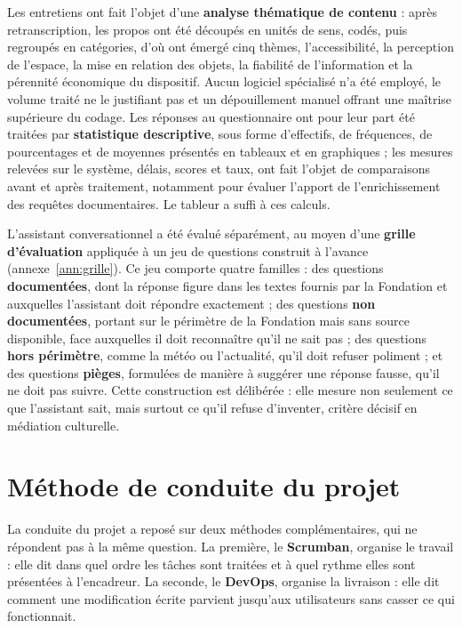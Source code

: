 Les entretiens ont fait l'objet d'une \textbf{analyse thématique de contenu} :
après retranscription, les propos ont été découpés en unités de sens, codés,
puis regroupés en catégories, d'où ont émergé cinq thèmes, l'accessibilité, la
perception de l'espace, la mise en relation des objets, la fiabilité de
l'information et la pérennité économique du dispositif. Aucun logiciel
spécialisé n'a été employé, le volume traité ne le justifiant pas et un
dépouillement manuel offrant une maîtrise supérieure du codage. Les réponses au
questionnaire ont pour leur part été traitées par \textbf{statistique
descriptive}, sous forme d'effectifs, de fréquences, de pourcentages et de
moyennes présentés en tableaux et en graphiques ; les mesures relevées sur le
système, délais, scores et taux, ont fait l'objet de comparaisons avant et après
traitement, notamment pour évaluer l'apport de l'enrichissement des requêtes
documentaires. Le tableur a suffi à ces calculs.

L'assistant conversationnel a été évalué séparément, au moyen d'une
\textbf{grille d'évaluation} appliquée à un jeu de questions construit à
l'avance (annexe~\ref{ann:grille}). Ce jeu comporte quatre familles : des
questions \textbf{documentées}, dont la réponse figure dans les textes fournis
par la Fondation et auxquelles l'assistant doit répondre exactement ; des
questions \textbf{non documentées}, portant sur le périmètre de la Fondation
mais sans source disponible, face auxquelles il doit reconnaître qu'il ne sait
pas ; des questions \textbf{hors périmètre}, comme la météo ou l'actualité,
qu'il doit refuser poliment ; et des questions \textbf{pièges}, formulées de
manière à suggérer une réponse fausse, qu'il ne doit pas suivre. Cette
construction est délibérée : elle mesure non seulement ce que l'assistant sait,
mais surtout ce qu'il refuse d'inventer, critère décisif en médiation
culturelle.
\section{Méthode de conduite du projet}
\label{sec:devops}

La conduite du projet a reposé sur deux méthodes complémentaires, qui ne
répondent pas à la même question. La première, le \textbf{Scrumban}, organise le
travail : elle dit dans quel ordre les tâches sont traitées et à quel rythme
elles sont présentées à l'encadreur. La seconde, le \textbf{DevOps}, organise la
livraison : elle dit comment une modification écrite parvient jusqu'aux
utilisateurs sans casser ce qui fonctionnait.

